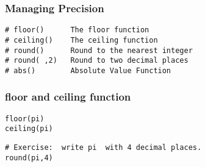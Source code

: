 \begin{frame}[fragile]

\frametitle{Managing Precision}


\begin{framed}
\begin{verbatim}
# floor() 	   The floor function 		
# ceiling()    The ceiling function       
# round()      Round to the nearest integer
# round( ,2)   Round to two decimal places
# abs()        Absolute Value Function
\end{verbatim}
\end{framed}
\end{frame}


\begin{frame}[fragile]

\frametitle{floor and ceiling function}

\begin{framed}
\begin{verbatim}
floor(pi)
ceiling(pi)
\end{verbatim}
\end{framed}

\begin{framed}
\begin{verbatim}
# Exercise:  write pi  with 4 decimal places.
round(pi,4)
\end{verbatim}
\end{framed}

\end{frame}


\begin{frame}




\end{frame}
